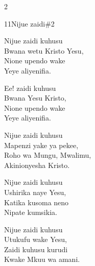 \begin{multicols}{2}
\begin{hymn}{11}{Nijue zaidi}{\#2}
\begin{stanza}
Nijue zaidi kuhusu\\
Bwana wetu Kristo Yesu,\\
Nione upendo wake\\
Yeye aliyenifia.
\end{stanza}
\begin{chorus}
Ee! zaidi kuhusu\\
Bwana Yesu Kristo,\\
Nione upendo wake\\
Yeye aliyenifia.
\end{chorus}
\begin{stanza}
Nijue zaidi kuhusu\\
Mapenzi yake ya pekee,\\
Roho wa Mungu, Mwalimu,\\
Akinionyesha Kristo.
\end{stanza}
\begin{stanza}
Nijue zaidi kuhusu\\
Ushirika naye Yesu,\\
Katika kusoma neno\\
Nipate kumsikia.
\end{stanza}
\begin{stanza}
Nijue zaidi kuhusu\\
Utukufu wake Yesu,\\
Zaidi kuhusu kurudi\\
Kwake Mkuu wa amani.
\end{stanza}
\end{hymn}


\end{multicols}
